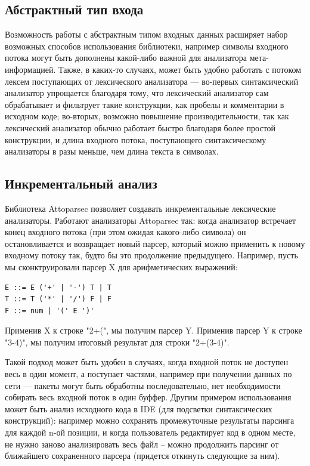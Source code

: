 \documentclass[14pt]{matmex-diploma}
\begin{document}
\subsection{Абстрактный тип входа}

Возможность работы с абстрактным типом входных данных расширяет набор возможных способов использования библиотеки, 
например символы входного потока могут быть дополнены какой-либо важной для анализатора мета-информацией.
Также, в каких-то случаях, может быть удобно работать с потоком лексем поступающих от лексического анализатора --- 
во-первых синтаксический анализатор упрощается благодаря тому,
что лексический анализатор сам обрабатывает и фильтрует такие конструкции, 
как пробелы и комментарии в исходном коде; во-вторых, возможно повышение 
производительности, так как лексический анализатор обычно работает 
быстро благодаря более простой конструкции, и длина входного потока, 
поступающего синтаксическому анализаторы в разы меньше, чем длина текста в символах.

\subsection{Инкрементальный анализ}
Библиотека Attoparsec позволяет создавать инкрементальные лексические 
анализаторы. Работают анализаторы Attoparsec так: когда анализатор встречает конец входного потока (при этом ожидая 
какого-либо символа) он остановливается и возвращает новый парсер, 
который можно применить к новому входному потоку так, будто бы это 
продолжение предыдущего. Например, пусть мы сконктруировали парсер X 
для арифметических выражений:
\begin{lstlisting}
E ::= E ('+' | '-') T | T
T ::= T ('*' | '/') F | F
F ::= num | '(' E ')' 
\end{lstlisting}
Применив X к строке "2+(", мы получим парсер Y. 
Применив парсер Y к строке "3-4)", мы получим итоговый результат для строки "2+(3-4)". 

Такой подход может быть удобен в случаях, когда входной поток не доступен 
весь в один момент, а поступает частями, например при получении данных по сети --- 
пакеты могут быть обработны последовательно, нет необходимости собирать весь 
входной поток в один буффер.
Другим примером использования может быть анализ исходного кода в IDE 
(для подсветки синтаксических конструкций): например можно сохранять 
промежуточные результаты парсинга для каждой n-ой позиции, и когда 
пользователь редактирует код в одном месте, не нужно заново анализировать 
весь файл – можно продолжить парсинг от ближайшего сохраненного 
парсера (придется откинуть следующие за ним).
\end{document}
